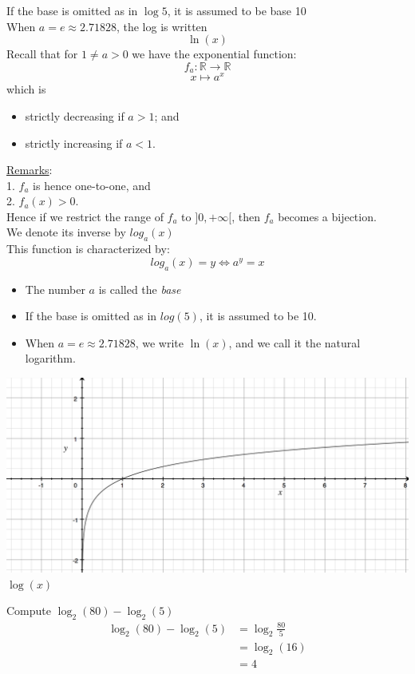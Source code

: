\documentclass[]{article}
\begin{document}
	If the base is omitted as in $\log 5$, it is assumed to be base 10\\
	When $a=e\approx 2.71828$, the log is written
	$$\ln(x)$$
	Recall that for $1\ne a>0$ we have the exponential function:
	$$f_a:\mathbb{R}\longrightarrow\mathbb{R}$$
	$$x\mapsto a^x$$
	which is 
	\begin{itemize}
		\item strictly decreasing if $a>1$; and
		\item strictly increasing if $a<1$.
	\end{itemize}
	\underline{Remarks}:\\
	1. $f_a$ is hence one-to-one, and\\
	2. $f_a(x)>0$.\\
	Hence if we restrict the range of $f_a$ to $]0,+\infty[$, then $f_a$ becomes a bijection.\\
	We denote its inverse by $log_a(x)$\\
	This function is characterized by:
	$$
	log_a(x)=y\iff a^y=x
	$$
	\begin{itemize}
		\item The number $a$ is called the \emph{base}
		\item If the base is omitted as in $log(5)$, it is assumed to be 10.
		\item When $a=e\approx 2.71828$, we write $\ln(x)$, and we call it the natural logarithm.
	\end{itemize}
	\begin{center}
		\includegraphics[scale=0.4]{./graphics/logx.png}\\
		\emph{$\log(x)$}
	\end{center}
	Compute $\log_2(80)-\log_2(5)$
	\begin{align*}
		\log_2(80)-\log_2(5)&=\log_2\frac{80}{5}\\
		&=\log_2(16)\\
		&=4
	\end{align*}
\end{document}
